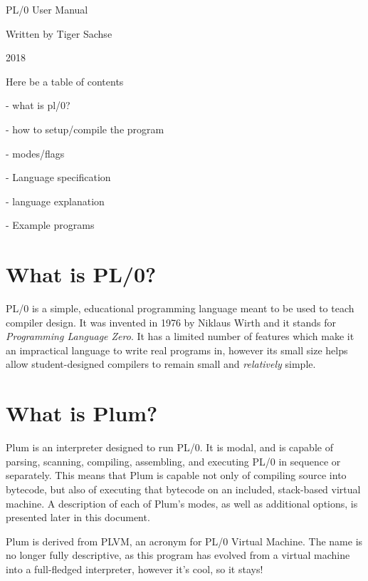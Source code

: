 \documentclass{article}
\begin{document}
\begin{center}
{\Huge
    PL/0 User Manual
}

{\Large 
    Written by Tiger Sachse

    2018
}
\end{center}

\pagebreak
Here be a table of contents

- what is pl/0?

- how to setup/compile the program

- modes/flags

- Language specification

- language explanation

- Example programs

\pagebreak

\section*{What is PL/0?}
PL/0 is a simple, educational programming language meant to be used to teach compiler
design. It was invented in 1976 by Niklaus Wirth and it stands for
\textit{Programming Language Zero}. It has a limited number of features which make
it an impractical language to write real programs in, however its small size helps
allow student-designed compilers to remain small and \textit{relatively} simple.

\section*{What is Plum?}
Plum is an interpreter designed to run PL/0. It is modal, and is capable of parsing,
scanning, compiling, assembling, and executing PL/0 in sequence or separately. This means
that Plum is capable not only of compiling source into bytecode, but also of executing
that bytecode on an included, stack-based virtual machine. A description of each of Plum's
modes, as well as additional options, is presented later in this document.

Plum is derived from PLVM, an acronym for PL/0 Virtual Machine.
The name is no longer fully descriptive, as this program has evolved from a virtual machine into a
full-fledged interpreter, however it's cool, so it stays!
\end{document}
